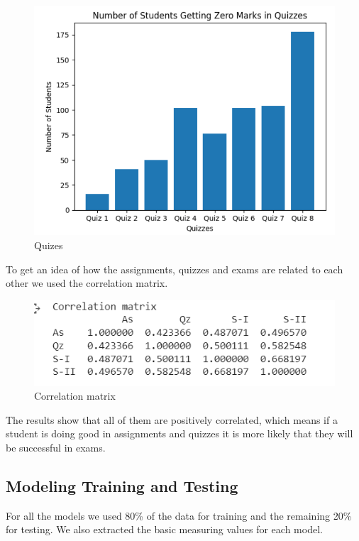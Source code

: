 \documentclass[12pt,a4paper]{article}
\begin{document}
\begin{figure}[h]
    \centering
    \includegraphics[scale=0.50]{Other/Quizzes.png}
    \caption{Quizes}
\end{figure}
\newpage
To get an idea of how the assignments, quizzes and exams are related to each other we used the correlation matrix. 
\begin{figure}[h]
    \centering
    \includegraphics[scale=0.60]{Other/correlation_matrix.png}
    \caption{Correlation matrix}
\end{figure}
The results show that all of them are positively correlated, which means if a student is doing good in assignments and quizzes it is more likely that they will be successful in exams.
\subsection{Modeling Training and Testing}
For all the models we used 80\% of the data for training and the remaining 20\% for testing. We also extracted the basic measuring values for each model.
\end{document}
